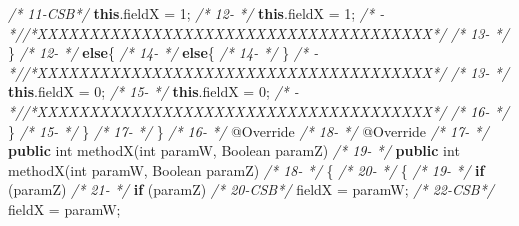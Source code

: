 \documentclass[
]{article}
\newenvironment{Shaded}{\begin{snugshade}}{\end{snugshade}}
\newcommand{\AttributeTok}[1]{\textcolor[rgb]{0.77,0.63,0.00}{#1}}
\newcommand{\BuiltInTok}[1]{#1}
\newcommand{\CommentTok}[1]{\textcolor[rgb]{0.56,0.35,0.01}{\textit{#1}}}
\newcommand{\DataTypeTok}[1]{\textcolor[rgb]{0.13,0.29,0.53}{#1}}
\newcommand{\DecValTok}[1]{\textcolor[rgb]{0.00,0.00,0.81}{#1}}
\newcommand{\FunctionTok}[1]{\textcolor[rgb]{0.00,0.00,0.00}{#1}}
\newcommand{\KeywordTok}[1]{\textcolor[rgb]{0.13,0.29,0.53}{\textbf{#1}}}
\newcommand{\NormalTok}[1]{#1}
\begin{document}
\begin{Shaded}
\begin{Highlighting}[]
\CommentTok{/* 11{-}CSB*/}            \KeywordTok{this}\NormalTok{.}\FunctionTok{fieldX}\NormalTok{ = }\DecValTok{1}\NormalTok{;                             }\CommentTok{/* 12{-}   */}            \KeywordTok{this}\NormalTok{.}\FunctionTok{fieldX}\NormalTok{ = }\DecValTok{1}\NormalTok{;                             }
\CommentTok{/*   {-}   *//*XXXXXXXXXXXXXXXXXXXXXXXXXXXXXXXXXXXXXX*/}               \CommentTok{/* 13{-}   */}\NormalTok{        \}                                                            }
\CommentTok{/* 12{-}   */}        \KeywordTok{else}\NormalTok{\{                                            }\CommentTok{/* 14{-}   */}        \KeywordTok{else}\NormalTok{\{                                            }
\CommentTok{/* 14{-}   */}\NormalTok{     \}                                                        }\CommentTok{/*   {-}   *//*XXXXXXXXXXXXXXXXXXXXXXXXXXXXXXXXXXXXXX*/}               
\CommentTok{/* 13{-}   */}            \KeywordTok{this}\NormalTok{.}\FunctionTok{fieldX}\NormalTok{ = }\DecValTok{0}\NormalTok{;                             }\CommentTok{/* 15{-}   */}            \KeywordTok{this}\NormalTok{.}\FunctionTok{fieldX}\NormalTok{ = }\DecValTok{0}\NormalTok{;                             }
\CommentTok{/*   {-}   *//*XXXXXXXXXXXXXXXXXXXXXXXXXXXXXXXXXXXXXX*/}               \CommentTok{/* 16{-}   */}\NormalTok{        \}                                                }
\CommentTok{/* 15{-}   */}\NormalTok{    \}                                                    }\CommentTok{/* 17{-}   */}\NormalTok{    \}                                                    }
\CommentTok{/* 16{-}   */}    \AttributeTok{@Override}                                            \CommentTok{/* 18{-}   */}    \AttributeTok{@Override}                                            
\CommentTok{/* 17{-}   */}    \KeywordTok{public} \DataTypeTok{int} \FunctionTok{methodX}\NormalTok{(}\DataTypeTok{int}\NormalTok{ paramW, }\BuiltInTok{Boolean}\NormalTok{ paramZ)       }\CommentTok{/* 19{-}   */}    \KeywordTok{public} \DataTypeTok{int} \FunctionTok{methodX}\NormalTok{(}\DataTypeTok{int}\NormalTok{ paramW, }\BuiltInTok{Boolean}\NormalTok{ paramZ)       }
\CommentTok{/* 18{-}   */}\NormalTok{    \{                                                    }\CommentTok{/* 20{-}   */}\NormalTok{    \{                                                    }
\CommentTok{/* 19{-}   */}        \KeywordTok{if}\NormalTok{ (paramZ)                                      }\CommentTok{/* 21{-}   */}        \KeywordTok{if}\NormalTok{ (paramZ)                                      }
\CommentTok{/* 20{-}CSB*/}\NormalTok{            fieldX = paramW;                             }\CommentTok{/* 22{-}CSB*/}\NormalTok{            fieldX = paramW;                             }

\end{Highlighting}
\end{Shaded}
\end{document}
